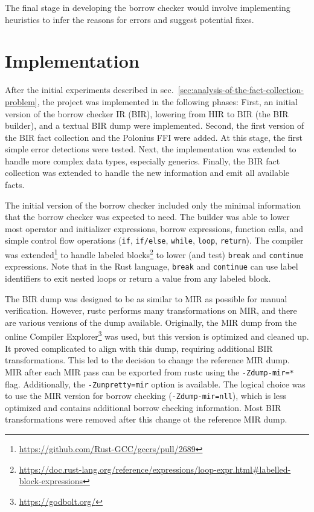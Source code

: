 \documentclass[
  11pt,
  twoside,symmetric]{report}
\DeclareRobustCommand{\href}[2]{#2\footnote{\url{#1}}}
\begin{document}
The final stage in developing the borrow checker would involve
implementing heuristics to infer the reasons for errors and suggest
potential fixes.

\chapter{Implementation}\label{sec:implementation}

After the initial experiments described in
sec.~\ref{sec:analysis-of-the-fact-collection-problem}, the project was
implemented in the following phases: First, an initial version of the
borrow checker IR (BIR), lowering from HIR to BIR (the BIR builder), and
a textual BIR dump were implemented. Second, the first version of the
BIR fact collection and the Polonius FFI were added. At this stage, the
first simple error detections were tested. Next, the implementation was
extended to handle more complex data types, especially generics.
Finally, the BIR fact collection was extended to handle the new
information and emit all available facts.

The initial version of the borrow checker included only the minimal
information that the borrow checker was expected to need. The builder
was able to lower most operator and initializer expressions, borrow
expressions, function calls, and simple control flow operations
(\texttt{if}, \texttt{if/else}, \texttt{while}, \texttt{loop},
\texttt{return}). The compiler was
\href{https://github.com/Rust-GCC/gccrs/pull/2689}{extended} to handle
\href{https://doc.rust-lang.org/reference/expressions/loop-expr.html\#labelled-block-expressions}{labeled
blocks} to lower (and test) \texttt{break} and \texttt{continue}
expressions. Note that in the Rust language, \texttt{break} and
\texttt{continue} can use label identifiers to exit nested loops or
return a value from any labeled block.

The BIR dump was designed to be as similar to MIR as possible for manual
verification. However, rustc performs many transformations on MIR, and
there are various versions of the dump available. Originally, the MIR
dump from the online \href{https://godbolt.org/}{Compiler Explorer} was
used, but this version is optimized and cleaned up. It proved
complicated to align with this dump, requiring additional BIR
transformations. This led to the decision to change the reference MIR
dump. MIR after each MIR pass can be exported from rustc using the
\texttt{-Zdump-mir=*} flag. Additionally, the \texttt{-Zunpretty=mir}
option is available. The logical choice was to use the MIR version for
borrow checking (\texttt{-Zdump-mir=nll}), which is less optimized and
contains additional borrow checking information. Most BIR
transformations were removed after this change ot the reference MIR
dump.
\end{document}

